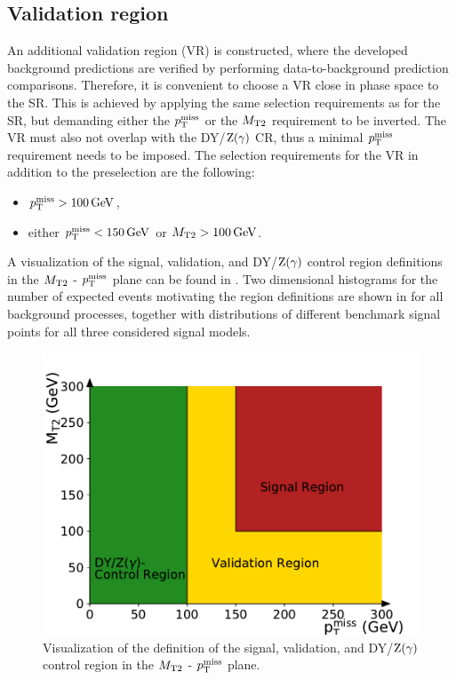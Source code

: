 \subsection{Validation region}
An additional validation region (VR) is constructed, where the developed background predictions are verified by performing data-to-background prediction comparisons. Therefore, it is convenient to choose a VR close in phase space to the SR. This is achieved by applying the same selection requirements as for the SR, but demanding either the $p_{\mathrm{T}}^\text{miss}$ or the $M_{\mathrm{T2}}$ requirement to be inverted. The VR must also not overlap with the DY/$\mathrm{Z}(\gamma)$ CR, thus a minimal $p_{\mathrm{T}}^\text{miss}$ requirement needs to be imposed. The selection requirements for the VR in addition to the preselection are the following:
\begin{itemize}
 \item $p_{\mathrm{T}}^\text{miss}>100\,\text{Ge\hspace{-.08em}V}$,
 \item either $p_{\mathrm{T}}^\text{miss}<150\,\text{Ge\hspace{-.08em}V}$ or $M_{\mathrm{T2}}>100\,\text{Ge\hspace{-.08em}V}$.
\end{itemize}
\vspace{\baselineskip}
A visualization of the signal, validation, and DY/$\mathrm{Z}(\gamma)$ control region definitions in the $M_{\mathrm{T2}}$ - $p_{\mathrm{T}}^\text{miss}$ plane can be found in . Two dimensional histograms for the number of expected events motivating the region definitions are shown in  for all background processes, together with distributions of different benchmark signal points for all three considered signal models.
\begin{figure}[tbp]
 \centering
 \includegraphics[width=\pairwidth]{figures/figures/regions}
 \caption{Visualization of the definition of the signal, validation, and DY/$\mathrm{Z}(\gamma)$ control region in the $M_{\mathrm{T2}}$ - $p_{\mathrm{T}}^\text{miss}$ plane.}
 \label{fig:Regions}
\end{figure}
